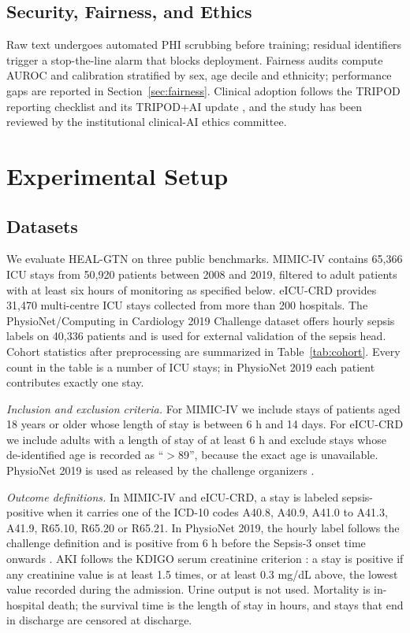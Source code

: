 \documentclass[conference]{IEEEtran}
\begin{document}
\subsection{Security, Fairness, and Ethics}
Raw text undergoes automated PHI scrubbing \cite{dernoncourt2017} before training; residual identifiers trigger a stop-the-line alarm that blocks deployment. Fairness audits compute AUROC and calibration stratified by sex, age decile and ethnicity; performance gaps are reported in Section~\ref{sec:fairness}. Clinical adoption follows the TRIPOD reporting checklist \cite{collins2015tripod} and its TRIPOD+AI update \cite{collins2024tripodai}, and the study has been reviewed by the institutional clinical-AI ethics committee.

\section{Experimental Setup}
\subsection{Datasets}\label{sec:data}
We evaluate HEAL-GTN on three public benchmarks. MIMIC-IV \cite{johnson2023mimiciv} contains 65,366 ICU stays from 50,920 patients between 2008 and 2019, filtered to adult patients with at least six hours of monitoring as specified below. eICU-CRD \cite{pollard2018eicu} provides 31,470 multi-centre ICU stays collected from more than 200 hospitals. The PhysioNet/Computing in Cardiology 2019 Challenge dataset \cite{reyna2020} offers hourly sepsis labels on 40,336 patients and is used for external validation of the sepsis head. Cohort statistics after preprocessing are summarized in Table~\ref{tab:cohort}. Every count in the table is a number of ICU stays; in PhysioNet 2019 each patient contributes exactly one stay.

\textit{Inclusion and exclusion criteria.} For MIMIC-IV we include stays of patients aged 18 years or older whose length of stay is between 6 h and 14 days. For eICU-CRD we include adults with a length of stay of at least 6 h and exclude stays whose de-identified age is recorded as ``$>$89'', because the exact age is unavailable. PhysioNet 2019 is used as released by the challenge organizers \cite{reyna2020}.

\textit{Outcome definitions.} In MIMIC-IV and eICU-CRD, a stay is labeled sepsis-positive when it carries one of the ICD-10 codes A40.8, A40.9, A41.0 to A41.3, A41.9, R65.10, R65.20 or R65.21. In PhysioNet 2019, the hourly label follows the challenge definition and is positive from 6 h before the Sepsis-3 onset time onwards \cite{reyna2020}. AKI follows the KDIGO serum creatinine criterion \cite{kdigo2012}: a stay is positive if any creatinine value is at least 1.5 times, or at least 0.3 mg/dL above, the lowest value recorded during the admission. Urine output is not used. Mortality is in-hospital death; the survival time is the length of stay in hours, and stays that end in discharge are censored at discharge.
\end{document}
